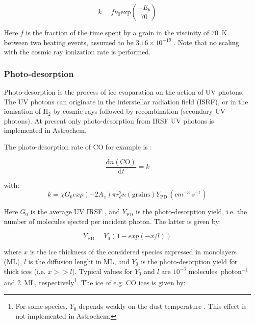 \documentclass[a4paper,12pt]{article}
\newcommand{\conc}[1]{n(\mathrm{#1})}
\begin{document}
{\begin{equation}
  k = f \nu_{0} \mathrm{exp} \left( \frac{-E_{b}}{70} \right)
  \label{eq:cosmic-ray-desorption}
\end{equation}

\noindent
Here $f$ is the fraction of the time spent by a grain in the viscinity
of 70~K between two heating events, assumed to be $3.16 \times
10^{-19}$ \citep{Hasegawa93a}. Note that no scaling with the cosmic
ray ionization rate is performed.

\subsubsection{Photo-desorption}
\label{sec:photo-desorption}

Photo-desorption is the process of ice evaparation on the action of UV
photons. The UV photons can originate in the interstellar radiation
field (ISRF), or in the ionisation of H$_{2}$ by cosmic-rays followed
by recombination (secondary UV photons). At present only
photo-desorption from IRSF UV photons is implemented in Astrochem.

The photo-desorption rate of CO for example is
\citep{Oberg09a,Oberg09b}:

\begin{equation}
  \frac{\mathrm{d} \conc{CO}}{\mathrm{d} t} = k
  \label{eq:photo-desorption-rate}
\end{equation}  

with:
\begin{equation}
  k = \chi G_{0} exp(-2 A_{v}) \pi r_{d}^{2} \conc{grains}
  Y_\mathrm{PD} \, (cm^{-3}~s^{-1})
  \label{eq:photo-desorption}
\end{equation}

\noindent
Here $G_{0}$ is the average UV IRSF \citep[assumed to be
10$^{8}$~photons~cm$^{-2}$~s$^{-1}$;][]{Habing68}, and $Y_\mathrm{PD}$
is the photo-desorption yield, i.e. the number of molecules ejected
per incident photon. The latter is given by:

\begin{equation}
  Y_\mathrm{PD} = Y_{0} (1 - exp(-x / l))
  \label{eq:photo-desorption-yield}
\end{equation}

\noindent
where $x$ is the ice thickness of the considered species expressed in
monolayers (ML), $l$ is the diffusion lenght in ML, and $Y_{0}$ is the
photo-desorption yield for thick ices (i.e. $x >> l$). Typical values
for $Y_{0}$ and $l$ are $10^{-3}$ molecules~photon$^{-1}$ and 2~ML,
  respectively\footnote{For some species, $Y_{0}$ depends weakly on
    the dust temperature \citep{Oberg09b}. This effect is not
    implemented in Astrochem.}. The ice of e.g. CO ices is given by:

}
\end{document}
